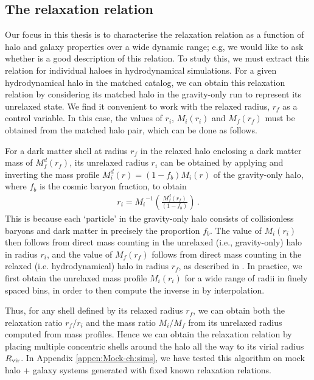 \subsection{The relaxation relation} %
\label{sec:methods-relx-reln-ch:sims}
Our focus in this thesis is to characterise the relaxation relation  as a function of halo and galaxy properties over a wide dynamic range; e.g, we would like to ask whether  is a good description of this relation.
To study this, we must extract this relation for individual haloes in hydrodynamical simulations.
For a given hydrodynamical halo in the matched catalog, we can obtain this relaxation relation by considering its matched halo in the gravity-only run to represent its unrelaxed state. 
We find it convenient to work with the relaxed radius, $r_f$ as a control variable. In this case, the values of $r_i$, $M_i(r_i)$ and $M_f(r_f)$ must be obtained from the matched halo pair, which can be done as follows.

For a dark matter shell at radius $r_f$ in the relaxed halo enclosing a dark matter mass of $M_f^d(r_f)$, its unrelaxed radius $r_i$ can be obtained by applying  and inverting the mass profile $M_i^d(r)=(1-f_b) M_i(r)$ of the gravity-only halo, where $f_b$ is the cosmic baryon fraction, to obtain 
\begin{align}
\label{eq:inv-mass}
r_i = {M_i}^{-1} \left( \frac{M_f^d(r_f)}{(1-f_b)} \right)\,.
\end{align}
This is because each `particle' in the gravity-only halo consists of collisionless baryons and dark matter in precisely the proportion $f_{b}$. 
The value of $M_i(r_i)$ then follows from direct mass counting in the unrelaxed (i.e., gravity-only) halo in radius $r_i$, and the value of $M_f(r_f)$ follows from direct mass counting in the relaxed (i.e. hydrodynamical) halo in radius $r_f$, as described in . In practice, we first obtain the unrelaxed mass profile $M_i(r_i)$ for a wide range of radii in finely spaced bins, in order to then compute the inverse in  by interpolation.

Thus, for any shell defined by its relaxed radius $r_f$, we can obtain both the relaxation ratio $r_f/r_i$ and the mass ratio $M_i/M_f$ from its unrelaxed radius computed from mass profiles. Hence we can obtain the relaxation relation by placing multiple concentric shells around the halo all the way to its virial radius $R_{\rm{vir}}$.
In Appendix \ref{appen:Mock-ch:sims}, we have tested this algorithm on mock halo + galaxy systems generated with fixed known relaxation relations.










